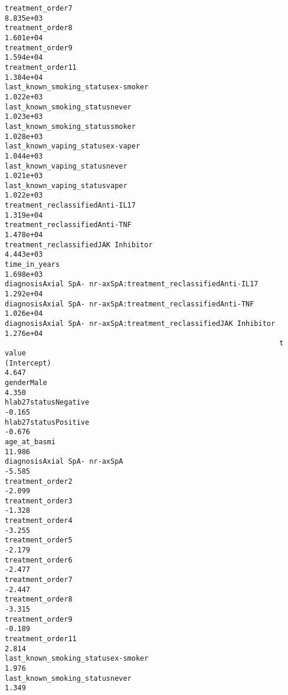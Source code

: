 \documentclass[
  letterpaper,
  DIV=11,
  numbers=noendperiod]{scrartcl}
\begin{document}
\begin{verbatim}
treatment_order7                                                  8.835e+03
treatment_order8                                                  1.601e+04
treatment_order9                                                  1.594e+04
treatment_order11                                                 1.384e+04
last_known_smoking_statusex-smoker                                1.022e+03
last_known_smoking_statusnever                                    1.023e+03
last_known_smoking_statussmoker                                   1.028e+03
last_known_vaping_statusex-vaper                                  1.044e+03
last_known_vaping_statusnever                                     1.021e+03
last_known_vaping_statusvaper                                     1.022e+03
treatment_reclassifiedAnti-IL17                                   1.319e+04
treatment_reclassifiedAnti-TNF                                    1.478e+04
treatment_reclassifiedJAK Inhibitor                               4.443e+03
time_in_years                                                     1.698e+03
diagnosisAxial SpA- nr-axSpA:treatment_reclassifiedAnti-IL17      1.292e+04
diagnosisAxial SpA- nr-axSpA:treatment_reclassifiedAnti-TNF       1.026e+04
diagnosisAxial SpA- nr-axSpA:treatment_reclassifiedJAK Inhibitor  1.276e+04
                                                                 t value
(Intercept)                                                        4.647
genderMale                                                         4.350
hlab27statusNegative                                              -0.165
hlab27statusPositive                                              -0.676
age_at_basmi                                                      11.986
diagnosisAxial SpA- nr-axSpA                                      -5.585
treatment_order2                                                  -2.099
treatment_order3                                                  -1.328
treatment_order4                                                  -3.255
treatment_order5                                                  -2.179
treatment_order6                                                  -2.477
treatment_order7                                                  -2.447
treatment_order8                                                  -3.315
treatment_order9                                                  -0.189
treatment_order11                                                  2.814
last_known_smoking_statusex-smoker                                 1.976
last_known_smoking_statusnever                                     1.349

\end{verbatim}
\end{document}
